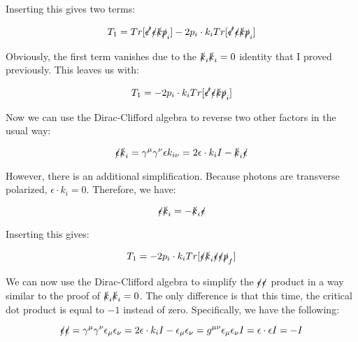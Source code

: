 \documentclass[a4]{article}
\begin{document}
    Inserting this gives two terms:

    \begin{equation}
        T_1 = Tr [\slashed{\epsilon'} \slashed{\epsilon} \slashed{k} \slashed{p}_i] - 2 p_i \cdot k_i Tr[\slashed{\epsilon'} \slashed{\epsilon} \slashed{k} \slashed{p}_i]
    \end{equation}

    Obviously, the first term vanishes due to the $\slashed{k}_i \slashed{k}_i = 0$ identity that I proved previously. This leaves us with:

    \begin{equation}
        T_1 = - 2 p_i \cdot k_i Tr[\slashed{\epsilon'} \slashed{\epsilon} \slashed{k} \slashed{p}_i]
    \end{equation}

    Now we can use the Dirac-Clifford algebra to reverse two other factors in the usual way:

    \begin{equation}
        \slashed{\epsilon} \slashed{k}_i = \gamma^{\mu} \gamma^{\nu} \epsilon k_{i \nu} = 2 \epsilon \cdot k_i I - \slashed{k}_i \slashed{\epsilon}
    \end{equation}

    However, there is an additional simplification. Because photons are transverse polarized, $\epsilon \cdot k_i = 0$. Therefore, we have:

    \begin{equation}
        \slashed{\epsilon} \slashed{k}_i = - \slashed{k}_i \slashed{\epsilon}
    \end{equation}

    Inserting this gives:

    \begin{equation}
        T_1 = -2 p_i \cdot k_i Tr[\slashed{\epsilon} \slashed{k}_i \slashed{\epsilon} \slashed{\epsilon} \slashed{p}_f]
    \end{equation}

    We can now use the Dirac-Clifford algebra to simplify the $\slashed{\epsilon} \slashed{\epsilon}$ product in a way similar to the proof of $\slashed{k}_i \slashed{k}_i = 0$.
    The only difference is that this time, the critical dot product is equal to $-1$ instead of zero. Specifically, we have the following:

    \begin{equation}
        \slashed{\epsilon} \slashed{\epsilon} = \gamma^{\mu} \gamma^{\nu} \epsilon_\mu \epsilon_\nu = 2 \epsilon \cdot k_i I - \epsilon_\mu \epsilon_\nu = g^{\mu \nu} \epsilon_\mu \epsilon_\nu I = \epsilon \cdot \epsilon I = - I
    \end{equation}
\end{document}
